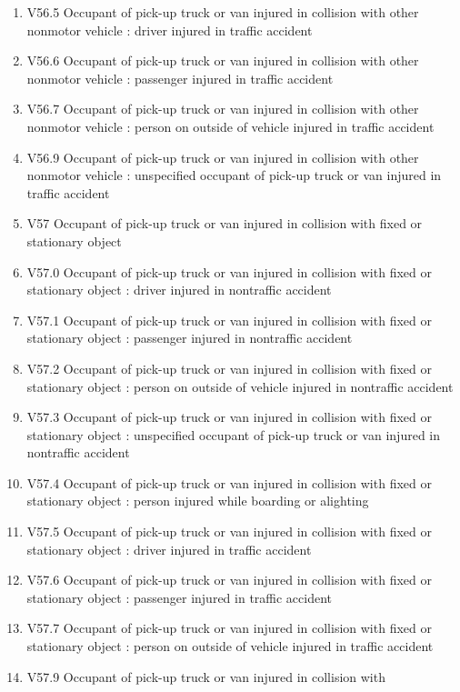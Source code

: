 \documentclass[
]{scrartcl}
\begin{document}
\begin{itemize}
\begin{enumerate}
  \item
    V56.5 Occupant of pick-up truck or van injured in collision with
    other nonmotor vehicle : driver injured in traffic accident
  \item
    V56.6 Occupant of pick-up truck or van injured in collision with
    other nonmotor vehicle : passenger injured in traffic accident
  \item
    V56.7 Occupant of pick-up truck or van injured in collision with
    other nonmotor vehicle : person on outside of vehicle injured in
    traffic accident
  \item
    V56.9 Occupant of pick-up truck or van injured in collision with
    other nonmotor vehicle : unspecified occupant of pick-up truck or
    van injured in traffic accident
  \item
    V57 Occupant of pick-up truck or van injured in collision with fixed
    or stationary object
  \item
    V57.0 Occupant of pick-up truck or van injured in collision with
    fixed or stationary object : driver injured in nontraffic accident
  \item
    V57.1 Occupant of pick-up truck or van injured in collision with
    fixed or stationary object : passenger injured in nontraffic
    accident
  \item
    V57.2 Occupant of pick-up truck or van injured in collision with
    fixed or stationary object : person on outside of vehicle injured in
    nontraffic accident
  \item
    V57.3 Occupant of pick-up truck or van injured in collision with
    fixed or stationary object : unspecified occupant of pick-up truck
    or van injured in nontraffic accident
  \item
    V57.4 Occupant of pick-up truck or van injured in collision with
    fixed or stationary object : person injured while boarding or
    alighting
  \item
    V57.5 Occupant of pick-up truck or van injured in collision with
    fixed or stationary object : driver injured in traffic accident
  \item
    V57.6 Occupant of pick-up truck or van injured in collision with
    fixed or stationary object : passenger injured in traffic accident
  \item
    V57.7 Occupant of pick-up truck or van injured in collision with
    fixed or stationary object : person on outside of vehicle injured in
    traffic accident
  \item
    V57.9 Occupant of pick-up truck or van injured in collision with

\end{enumerate}
\end{itemize}
\end{document}
